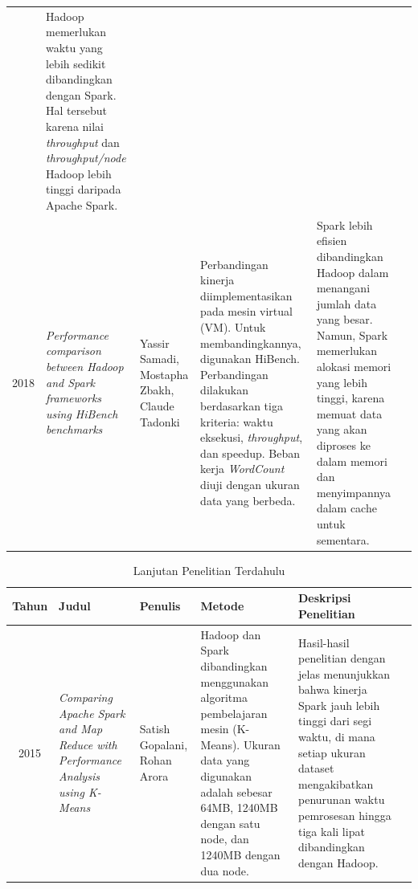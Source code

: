 \begin{table}[h]
\begin{tabularx}{\textwidth}{c*{5}{>{\raggedright\arraybackslash}X}}
  & Hadoop memerlukan waktu yang lebih sedikit dibandingkan dengan Spark. Hal tersebut karena nilai \textit{throughput} dan \textit{throughput/node} Hadoop lebih tinggi daripada Apache Spark. \\
2018 & \textit{Performance comparison between Hadoop and Spark frameworks using HiBench benchmarks \cite{samadiPerformanceComparisonHadoop2018}} 
  & Yassir Samadi, Mostapha Zbakh, Claude Tadonki 
  & Perbandingan kinerja diimplementasikan pada mesin virtual (VM). Untuk membandingkannya, digunakan HiBench. Perbandingan dilakukan berdasarkan tiga kriteria: waktu eksekusi, \textit{throughput}, dan speedup. Beban kerja \textit{WordCount} diuji dengan ukuran data yang berbeda.
  & Spark lebih efisien dibandingkan Hadoop dalam menangani jumlah data yang besar. Namun, Spark memerlukan alokasi memori yang lebih tinggi, karena memuat data yang akan diproses ke dalam memori dan menyimpannya dalam cache untuk sementara. \\
\bottomrule
\end{tabularx}
\end{table}

\begin{table}[ht]
\caption{Lanjutan Penelitian Terdahulu}
\label{table:penelitian-dulu-lanjutan}
\scriptsize
\begin{tabularx}{\textwidth}{c*{5}{>{\raggedright\arraybackslash}X}}
\toprule
\textbf{Tahun} & \textbf{Judul} & \textbf{Penulis} & \textbf{Metode} 
  & \textbf{Deskripsi Penelitian} \\
\midrule
 2015 & \textit{Comparing Apache Spark and Map Reduce with Performance Analysis using K-Means \cite{gopalaniComparingApacheSpark2015}} 
  & Satish Gopalani, Rohan Arora
  & Hadoop dan Spark dibandingkan menggunakan algoritma pembelajaran mesin (K-Means). Ukuran data yang digunakan adalah sebesar 64MB, 1240MB dengan satu node, dan 1240MB dengan dua node.  
  & Hasil-hasil penelitian dengan jelas menunjukkan bahwa kinerja Spark jauh lebih tinggi dari segi waktu, di mana setiap ukuran dataset mengakibatkan penurunan waktu pemrosesan hingga tiga kali lipat dibandingkan dengan Hadoop. \\
\bottomrule
\end{tabularx}
\end{table}



